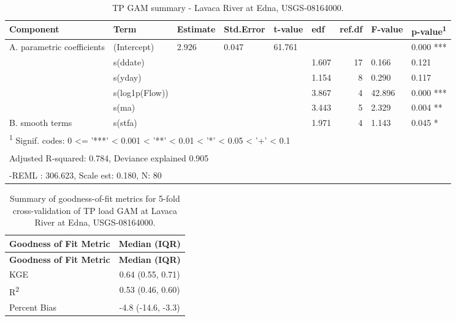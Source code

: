 \documentclass[
]{article}
\newenvironment{widestuff}{\begin{table}[h]\begin{adjustwidth}{-4.5cm}{-4.5cm}\centering}{\end{adjustwidth}\end{table}}
\begin{document}
\begin{widestuff}

\caption{TP GAM summary - Lavaca River at Edna, USGS-08164000.}
\centering
\begin{tabular}[t]{llllllrll}
\toprule
Component & Term & Estimate & Std.Error & t-value & edf & ref.df & F-value & p-value\textsuperscript{1}\\
\midrule
A. parametric coefficients & (Intercept) & 2.926 & 0.047 & 61.761 &  &  &  & 0.000 ***\\
\cmidrule{1-9}
 & s(ddate) &  &  &  & 1.607 & 17 & 0.166 & 0.121\\

 & s(yday) &  &  &  & 1.154 & 8 & 0.290 & 0.117\\

 & s(log1p(Flow)) &  &  &  & 3.867 & 4 & 42.896 & 0.000 ***\\

 & s(ma) &  &  &  & 3.443 & 5 & 2.329 & 0.004 **\\

\multirow[t]{-5}{*}{\raggedright\arraybackslash B. smooth terms} & s(stfa) &  &  &  & 1.971 & 4 & 1.143 & 0.045 *\\
\bottomrule
\multicolumn{9}{l}{\textsuperscript{1} Signif. codes: 0 <= '***' < 0.001 < '**' < 0.01 < '*' < 0.05 < '+' < 0.1}\\
\multicolumn{9}{l}{\textsuperscript{} Adjusted R-squared: 0.784, Deviance explained 0.905}\\
\multicolumn{9}{l}{\textsuperscript{} -REML : 306.623, Scale est: 0.180, N: 80}\\
\end{tabular}
\end{widestuff}

\hypertarget{tbl-TP308164000-CV}{}
\begin{longtable}[]{@{}lc@{}}
\caption{\label{tbl-TP308164000-CV}Summary of goodness-of-fit metrics
for 5-fold cross-validation of TP load GAM at Lavaca River at Edna,
USGS-08164000.}\tabularnewline
\toprule()
\textbf{Goodness of Fit Metric} & \textbf{Median (IQR)} \\
\midrule()
\endfirsthead
\toprule()
\textbf{Goodness of Fit Metric} & \textbf{Median (IQR)} \\
\midrule()
\endhead
KGE & 0.64 (0.55, 0.71) \\
R\textsuperscript{2} & 0.53 (0.46, 0.60) \\
Percent Bias & -4.8 (-14.6, -3.3) \\
\bottomrule()
\end{longtable}
\end{document}
